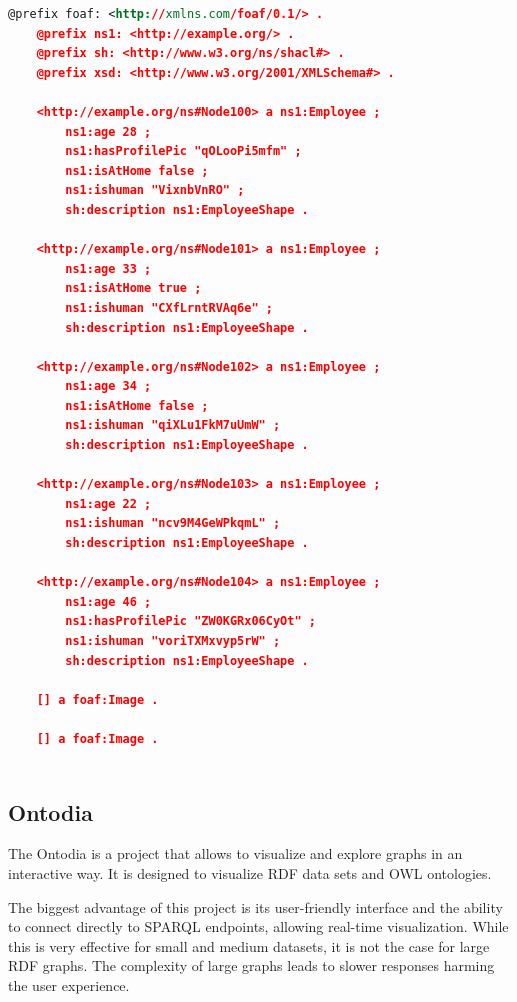   \begin{lstlisting}[language=XML, caption={Results of RDFGraphGen with 5 instances generated}, basicstyle=\ttfamily\footnotesize, frame=single]
    @prefix foaf: <http://xmlns.com/foaf/0.1/> .
    @prefix ns1: <http://example.org/> .
    @prefix sh: <http://www.w3.org/ns/shacl#> .
    @prefix xsd: <http://www.w3.org/2001/XMLSchema#> .
    
    <http://example.org/ns#Node100> a ns1:Employee ;
        ns1:age 28 ;
        ns1:hasProfilePic "qOLooPi5mfm" ;
        ns1:isAtHome false ;
        ns1:ishuman "VixnbVnRO" ;
        sh:description ns1:EmployeeShape .
    
    <http://example.org/ns#Node101> a ns1:Employee ;
        ns1:age 33 ;
        ns1:isAtHome true ;
        ns1:ishuman "CXfLrntRVAq6e" ;
        sh:description ns1:EmployeeShape .
    
    <http://example.org/ns#Node102> a ns1:Employee ;
        ns1:age 34 ;
        ns1:isAtHome false ;
        ns1:ishuman "qiXLu1FkM7uUmW" ;
        sh:description ns1:EmployeeShape .
    
    <http://example.org/ns#Node103> a ns1:Employee ;
        ns1:age 22 ;
        ns1:ishuman "ncv9M4GeWPkqmL" ;
        sh:description ns1:EmployeeShape .
    
    <http://example.org/ns#Node104> a ns1:Employee ;
        ns1:age 46 ;
        ns1:hasProfilePic "ZW0KGRx06CyOt" ;
        ns1:ishuman "voriTXMxvyp5rW" ;
        sh:description ns1:EmployeeShape .
    
    [] a foaf:Image .
    
    [] a foaf:Image .
    
\end{lstlisting}


\subsection{Ontodia}

The Ontodia is a project that allows to visualize and explore graphs in an interactive way. It is designed to visualize RDF data sets and OWL ontologies.

The biggest advantage of this project is its user-friendly interface and the ability to connect directly to SPARQL endpoints, allowing real-time visualization. While this is very effective for small and medium datasets, it is not the case for large RDF graphs. The complexity of large graphs leads to slower responses harming the user experience.

